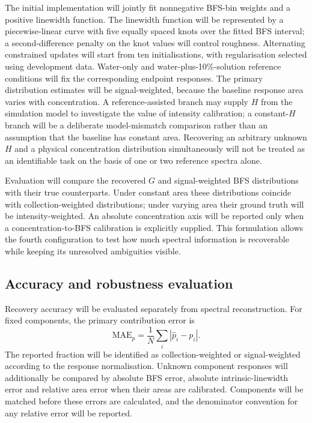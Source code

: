 \documentclass[11pt]{article}
\begin{document}
The initial implementation will jointly fit nonnegative BFS-bin weights and a positive linewidth function. The linewidth function will be represented by a piecewise-linear curve with five equally spaced knots over the fitted BFS interval; a second-difference penalty on the knot values will control roughness. Alternating constrained updates will start from ten initialisations, with regularisation selected using development data. Water-only and water-plus-10\%-solution reference conditions will fix the corresponding endpoint responses. The primary distribution estimates will be signal-weighted, because the baseline response area varies with concentration. A reference-assisted branch may supply $H$ from the simulation model to investigate the value of intensity calibration; a constant-$H$ branch will be a deliberate model-mismatch comparison rather than an assumption that the baseline has constant area. Recovering an arbitrary unknown $H$ and a physical concentration distribution simultaneously will not be treated as an identifiable task on the basis of one or two reference spectra alone.

Evaluation will compare the recovered $G$ and signal-weighted BFS distributions with their true counterparts. Under constant area these distributions coincide with collection-weighted distributions; under varying area their ground truth will be intensity-weighted. An absolute concentration axis will be reported only when a concentration-to-BFS calibration is explicitly supplied. This formulation allows the fourth configuration to test how much spectral information is recoverable while keeping its unresolved ambiguities visible.

\subsection{Accuracy and robustness evaluation}

Recovery accuracy will be evaluated separately from spectral reconstruction. For fixed components, the primary contribution error is
\begin{equation}
 \mathrm{MAE}_{p}=\frac{1}{N}\sum_i|\widehat p_i-p_i|.
 \label{eq:proportion_mae}
\end{equation}
The reported fraction will be identified as collection-weighted or signal-weighted according to the response normalisation. Unknown component responses will additionally be compared by absolute BFS error, absolute intrinsic-linewidth error and relative area error when their areas are calibrated. Components will be matched before these errors are calculated, and the denominator convention for any relative error will be reported.
\end{document}
